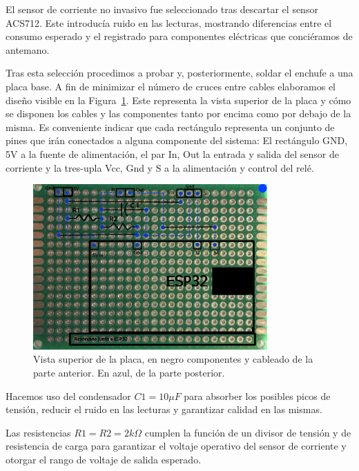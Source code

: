 \documentclass[a4paper,10pt]{article}
\begin{document}
El sensor de corriente no invasivo fue seleccionado tras descartar el
sensor ACS712\cite{ACS712DatasheetPDF}. Este introducía ruido en las
lecturas, mostrando diferencias entre el consumo esperado y el
registrado para componentes eléctricas que conciéramos de antemano.

Tras esta selección procedimos a probar y, posteriormente, soldar el
enchufe a una placa base. A fin de minimizar el número de cruces entre
cables elaboramos el diseño visible en
la Figura~\ref{fig:placa-sup-arriba-abajo}. Este representa la vista superior de
la placa y cómo se disponen los cables y las componentes tanto por
encima como por debajo de la misma. Es conveniente indicar que cada
rectángulo representa un conjunto de pines que irán conectados a
alguna componente del sistema: El rectángulo GND, 5V a la fuente de
alimentación, el par In, Out la entrada y salida del sensor de
corriente y la tres-upla Vcc, Gnd y S a la alimentación y control del
relé.

\begin{figure}
  \centering
  \includegraphics[width=0.8\textwidth]{img/dibujo_placa_vista_superior_arriba_y_abajo.png}
  \caption{Vista superior de la placa, en negro componentes y cableado
  de la parte anterior. En azul, de la parte posterior.}\label{fig:placa-sup-arriba-abajo}
\end{figure}

Hacemos uso del condensador $C1 = 10\mu F$ para absorber los
posibles picos de tensión, reducir el ruido en las lecturas y
garantizar calidad en las mismas.

Las resistencias $R1=R2=2k\Omega$ cumplen la función de un divisor de
tensión y de resistencia de carga para garantizar el voltaje operativo
del sensor de corriente y otorgar el rango de voltaje de salida esperado.
\end{document}
